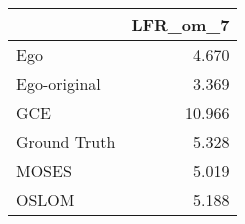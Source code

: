 \begin{tabular}{lr}
\toprule
{} & LFR_om_7 \\
\midrule
Ego          &    4.670 \\
Ego-original &    3.369 \\
GCE          &   10.966 \\
Ground Truth &    5.328 \\
MOSES        &    5.019 \\
OSLOM        &    5.188 \\
\bottomrule
\end{tabular}
